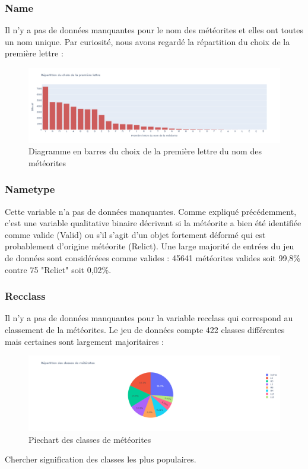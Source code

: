 \documentclass[12pt]{article}
\begin{document}
\subsubsection{Name}
Il n'y a pas de données manquantes pour le nom des météorites et elles ont toutes un nom unique. Par curiosité, nous avons regardé la répartition du choix de la première lettre :
\begin{figure}[H]
\centering
\includegraphics[width=15cm]{Images/exploration/name_barplot_lettres.png}
\caption{Diagramme en barres du choix de la première lettre du nom des météorites}
\end{figure}
\subsubsection{Nametype}
Cette variable n'a pas de données manquantes. Comme expliqué précédemment, c'est une variable qualitative binaire décrivant si la météorite a bien été identifiée comme valide (Valid) ou s'il s'agit d'un objet fortement déformé qui est probablement d'origine météorite (Relict). Une large majorité de entrées du jeu de données sont considéréees comme valides : 45641 météorites valides soit 99,8\% contre 75 "Relict" soit 0,02\%.
\subsubsection{Recclass}
Il n'y a pas de données manquantes pour la variable recclass qui correspond au classement de la météorites. Le jeu de données compte 422 classes différentes mais certaines sont largement majoritaires :
\begin{figure}[H]
\centering
\includegraphics[width=15cm]{Images/exploration/recclass_piechart_class.png}
\caption{Piechart des classes de météorites}
\end{figure}
Chercher signification des classes les plus populaires.
\end{document}
